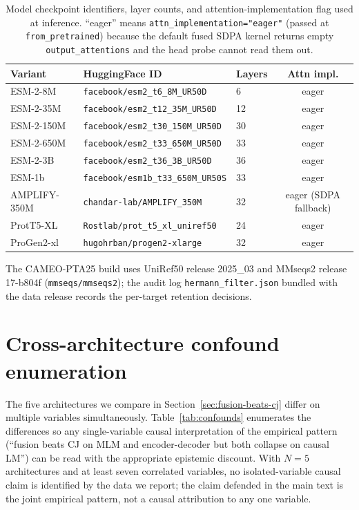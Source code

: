 \documentclass{article}
\begin{document}
\begin{table}[h]
\centering
\small
\caption{Model checkpoint identifiers, layer counts, and
attention-implementation flag used at inference. ``eager'' means
\texttt{attn\_implementation="eager"} (passed at \texttt{from\_pretrained})
because the default fused SDPA kernel returns empty
\texttt{output\_attentions} and the head probe cannot read them out.}
\label{tab:artifacts}
\begin{tabular}{lllc}
\toprule
Variant & HuggingFace ID & Layers & Attn impl. \\
\midrule
ESM-2-8M     & \texttt{facebook/esm2\_t6\_8M\_UR50D}     & 6  & eager \\
ESM-2-35M    & \texttt{facebook/esm2\_t12\_35M\_UR50D}   & 12 & eager \\
ESM-2-150M   & \texttt{facebook/esm2\_t30\_150M\_UR50D}  & 30 & eager \\
ESM-2-650M   & \texttt{facebook/esm2\_t33\_650M\_UR50D}  & 33 & eager \\
ESM-2-3B     & \texttt{facebook/esm2\_t36\_3B\_UR50D}    & 36 & eager \\
ESM-1b       & \texttt{facebook/esm1b\_t33\_650M\_UR50S} & 33 & eager \\
AMPLIFY-350M & \texttt{chandar-lab/AMPLIFY\_350M}        & 32 & eager (SDPA fallback) \\
ProtT5-XL    & \texttt{Rostlab/prot\_t5\_xl\_uniref50}   & 24 & eager \\
ProGen2-xl   & \texttt{hugohrban/progen2-xlarge}         & 32 & eager \\
\bottomrule
\end{tabular}
\end{table}

The CAMEO-PTA25 build uses UniRef50 release 2025\_03 and MMseqs2
release 17-b804f (\texttt{mmseqs/mmseqs2}); the audit log
\texttt{hermann\_filter.json} bundled with the data release records
the per-target retention decisions.

\section{Cross-architecture confound enumeration}
\label{app:confounds}

The five architectures we compare in Section~\ref{sec:fusion-beats-cj} differ
on multiple variables simultaneously. Table~\ref{tab:confounds} enumerates the
differences so any single-variable causal interpretation of the empirical
pattern (``fusion beats CJ on MLM and encoder-decoder but both collapse on
causal LM'') can be read with the appropriate epistemic discount. With $N=5$
architectures and at least seven correlated variables, no isolated-variable
causal claim is identified by the data we report; the claim defended in the
main text is the joint empirical pattern, not a causal attribution to any one
variable.
\end{document}
